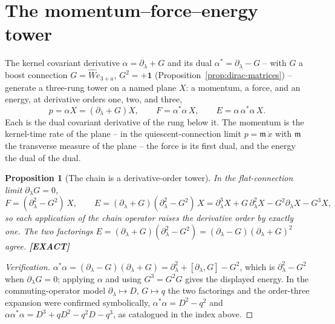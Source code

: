 \documentclass[11pt,oneside]{book}
\newcommand{\Wh}{\hat{W}}                         %
\newcommand{\status}[1]{{\sffamily\bfseries\color{statuscol}[#1]}}
\theoremstyle{plain}
\newtheorem{proposition}[theorem]{Proposition}
\theoremstyle{definition}
\theoremstyle{remark}
\begin{document}
\section{The momentum--force--energy tower}
\label{sec:tower-classical}

The kernel covariant derivative $\alpha=\partial_\lambda+G$ and its dual
$\alpha^*=\partial_\lambda-G$ -- with $G$ a boost connection $G=\Wh e_{3+a}$,
$G^2=+\mathbf 1$ (Proposition~\ref{prop:dirac-matrices}) -- generate a three-rung
tower on a named plane $X$: a momentum, a force, and an energy, at derivative orders
one, two, and three,
\[
  p=\alpha X=(\partial_\lambda+G)X,\qquad
  F=\alpha^*\alpha\,X,\qquad
  E=\alpha\,\alpha^*\alpha\,X .
\]
Each is the dual covariant derivative of the rung below it. The momentum is the
kernel-time rate of the plane -- in the quiescent-connection limit
$p=\mathfrak m\,\dot x$ with $\mathfrak m$ the transverse measure of the plane -- the
force is its first dual, and the energy the dual of the dual.

\begin{proposition}[The chain is a derivative-order tower]
\label{prop:tower-classical}
In the flat-connection limit $\partial_\lambda G=0$,
\[
  F=(\partial_\lambda^2-G^2)\,X,\qquad
  E=(\partial_\lambda+G)(\partial_\lambda^2-G^2)\,X
   =\partial_\lambda^3X+G\,\partial_\lambda^2X-G^2\partial_\lambda X-G^3X,
\]
so each application of the chain operator raises the derivative order by exactly one.
The two factorings
$E=(\partial_\lambda+G)(\partial_\lambda^2-G^2)=(\partial_\lambda-G)(\partial_\lambda+G)^2$
agree. \status{EXACT}
\end{proposition}

\begin{proof}[Verification]
$\alpha^*\alpha=(\partial_\lambda-G)(\partial_\lambda+G)
=\partial_\lambda^2+[\partial_\lambda,G]-G^2$, which is $\partial_\lambda^2-G^2$ when
$\partial_\lambda G=0$; applying $\alpha$ and using $G^3=G^2G$ gives the displayed
energy. In the commuting-operator model $\partial_\lambda\mapsto D$, $G\mapsto q$ the
two factorings and the order-three expansion were confirmed symbolically,
$\alpha^*\alpha=D^2-q^2$ and $\alpha\alpha^*\alpha=D^3+qD^2-q^2D-q^3$, as catalogued in
the index above.
\end{proof}
\end{document}
